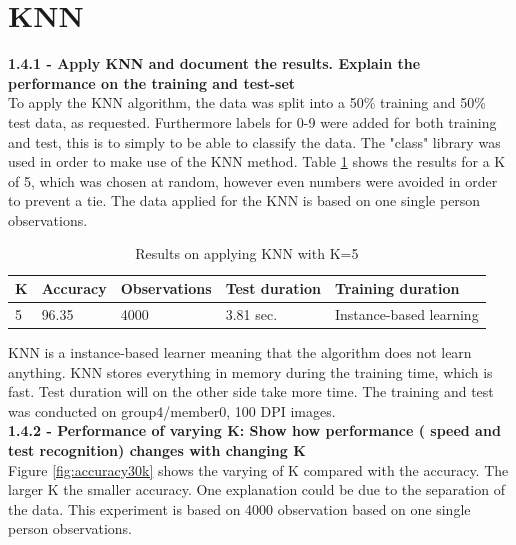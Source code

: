\section{KNN}
\textbf{1.4.1 - Apply KNN and document the results. Explain the performance on the training and test-set}\\

To apply the KNN algorithm, the data was split into a 50\% training and 50\% test data, as requested. Furthermore labels for 0-9 were added for both training and test, this is to simply to be able to classify the data. The "class" library was used in order to make use of the KNN method. Table \ref{ref:resultsFor5K} shows the results for a K of 5, which was chosen at random, however even numbers were avoided in order to prevent a tie. The data applied for the KNN is based on one single person observations.

\begin{table}[H]
\centering
\begin{tabular}{|l|l|l|l|l|}
\hline
K & Accuracy & Observations  & Test duration & Training duration \\ \hline
5 & 96.35    & 4000          & 3.81 sec.     & Instance-based learning           \\ \hline
\end{tabular}
\caption{Results on applying KNN with K=5}
\label{ref:resultsFor5K}
\end{table}

KNN is a instance-based learner meaning that the algorithm does not learn anything. KNN stores everything in memory during the training time, which is fast. Test duration will on the other side take more time. The training and test was conducted on group4/member0, 100 DPI images.\\

\noindent
\textbf{1.4.2 - Performance of varying K: Show how performance ( speed and test recognition) changes with changing K}\\

Figure \ref{fig:accuracy30k} shows the varying of K compared with the accuracy. The larger K the smaller accuracy. One explanation could be due to the separation of the data. This experiment is based on 4000 observation based on one single person observations.

